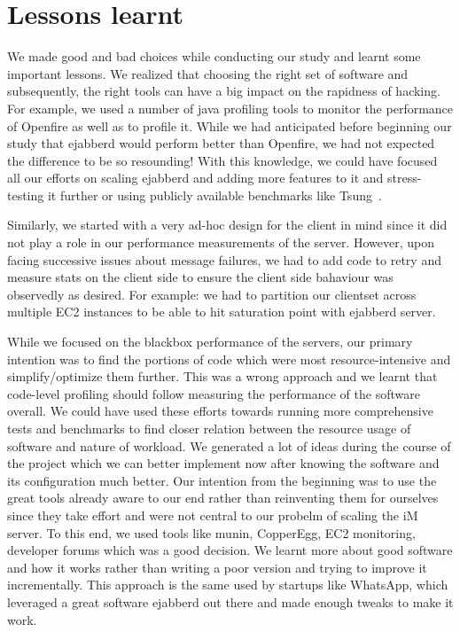 \documentclass[a4paper, twocolumn]{article}
\begin{document}
\section{Lessons learnt}
We made good and bad choices while conducting our study and learnt some important lessons. We realized that choosing the right set of software and subsequently, the right tools can have a big impact on the rapidness of hacking. For example, we used a number of java profiling tools to monitor the performance of Openfire as well as to profile it. While we had anticipated before beginning our study that ejabberd would perform better than Openfire, we had not expected the difference to be so resounding! With this knowledge, we could have focused all our efforts on scaling ejabberd and adding more features to it and stress-testing it further or using publicly available benchmarks like Tsung~\cite{tsung}.

Similarly, we started with a very ad-hoc design for the client in mind since it did not play a role in our performance measurements of the server. However, upon facing successive issues about message failures, we had to add code to retry and measure stats on the client side to ensure the client side bahaviour was observedly as desired. For example: we had to partition our clientset across multiple EC2 instances to be able to hit saturation point with ejabberd server. 

While we focused on the blackbox performance of the servers, our primary intention was to find the portions of code which were most resource-intensive and simplify/optimize them further. This was a wrong approach and we learnt that code-level profiling should follow measuring the performance of the software overall. We could have used these efforts towards running more comprehensive tests and benchmarks to find closer relation between the resource usage of software and nature of workload. 
We generated a lot of ideas during the course of the project which we can better implement now after knowing the software and its configuration much better. Our intention from the beginning was to use the great tools already aware to our end rather than reinventing them for ourselves since they take effort and were not central to our probelm of scaling the iM server. To this end, we used tools like munin, CopperEgg, EC2 monitoring, developer forums which was a good decision. We learnt more about good software and how it works rather than writing a poor version and trying to improve it incrementally.  This approach is the same used by startups like WhatsApp, which leveraged a great software ejabberd out there and made enough tweaks to make it work. 
\end{document}
